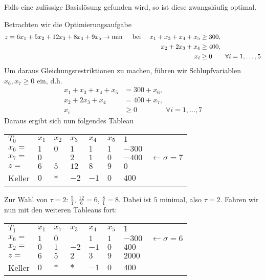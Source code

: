 \begin{bemerkung} %
	Falls eine zulässige Basislösung gefunden wird, so ist diese zwangsläufig optimal.
\end{bemerkung}

\begin{beispiel}
	Betrachten wir die Optimierungsaufgabe
	\begin{equation*}
		\begin{aligned}
			z = 6x_1 + 5x_2 + 12x_3 + 8x_4 + 9x_5 \to \min \quad \text{ bei } \quad 
			x_1 + x_3 + x_4 + x_5 &\ge 300, \\
			x_2 + 2x_3 + x_4 &\ge 400, \\
			x_i &\ge 0 \qquad \forall i = 1, \dots, 5
		\end{aligned}
	\end{equation*}
	Um daraus Gleichungsrestriktionen zu machen, führen wir Schlupfvariablen $x_6, x_7 \ge 0$ ein, d.h.
	\begin{equation*}
		\begin{aligned}
			x_1 + x_3 + x_4 + x_5 &= 300 + x_6 , \\
			x_2 + 2x_3 + x_4 &= 400 + x_7, \\
			x_i &\ge 0 \qquad \qquad \forall i = 1, \dots, 7
		\end{aligned}
	\end{equation*}
	Daraus ergibt sich nun folgendes Tableau
	\begin{indentpar}
		\begin{tabular}{R{1cm}|R{.5cm}R{.5cm}R{.5cm}R{.5cm}R{.5cm}|R{.9cm}l}
			$T_0$ & $x_1$ & $x_2$ & $x_3$ & $x_4$ & $x_5$ & $1$ \\ 
			$x_6 =$ & $1$ & $0$ & $1$ & $1$ & $1$ & $-300$ \\
			$x_7 =$ & $0$ &  & $2$ & $1$ & $0$ & $-400$ & $\leftarrow \sigma = 7$ \\ 
			$z =$   & $6$ & $5$ & $12$ & $8$ & $9$ & $0$ \\ 
			Keller  & $0$ & $\ast$ & $-2$ & $-1$ & $0$ & $400$
		\end{tabular}
	\end{indentpar}
	
	Zur Wahl von $\tau = 2$: $\frac{5}{1}$, $\frac{12}{6} = 6$, $\frac{8}{1} = 8$. Dabei ist $5$ minimal, also $\tau = 2$.
	Fahren wir nun mit den weiteren Tableaus fort:
	
	\begin{indentpar}
		\begin{tabular}{R{1cm}|R{.5cm}R{.5cm}R{.5cm}R{.5cm}R{.5cm}|R{.9cm}l}
			$T_1$   & $x_1$ & $x_7$  & $x_3$      & $x_4$ & $x_5$ & $1$ \\ \cline{1-7}
			$x_6 =$ & $1$   & $0$    &  & $1$   & $1$   & $-300$ & $\leftarrow \sigma = 6$ \\
			$x_2 =$ & $0$   & $1$    & $-2$       & $-1$  & $0$   & $400$ \\ \cline{1-7}
			$z =$   & $6$   & $5$    & $2$        & $3$   & $9$   & $2000$ \\ \cline{1-7}
			Keller  & $0$   & $\ast$ & $\ast$ & $-1$  & $0$   & $400$
		\end{tabular}


\end{indentpar}
\end{beispiel}
